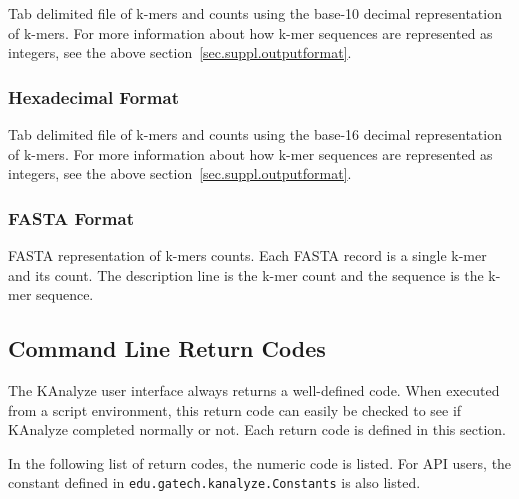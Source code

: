 Tab delimited file of k-mers and counts using the base-10 decimal representation of k-mers. For more information about how k-mer sequences are represented as integers, see the above section~\ref{sec.suppl.outputformat}.

\subsubsection{Hexadecimal Format}
\label{sec.suppl.outputformat.hex}

Tab delimited file of k-mers and counts using the base-16 decimal representation of k-mers. For more information about how k-mer sequences are represented as integers, see the above
section~\ref{sec.suppl.outputformat}.

\subsubsection{FASTA Format}
\label{sec.suppl.outputformat.fasta}

FASTA representation of k-mers counts. Each FASTA record is a single k-mer and its count. The description line is the k-mer count and the sequence is the k-mer sequence.


\subsection{Command Line Return Codes}
\label{sec.supl.retcode}

The KAnalyze user interface always returns a well-defined code. When executed from a script environment, this return code can easily be checked to see if KAnalyze completed normally or not. Each return code is defined in this section.

In the following list of return codes, the numeric code is listed. For API users, the constant defined in \texttt{edu.gatech.kanalyze.Constants} is also
listed.

